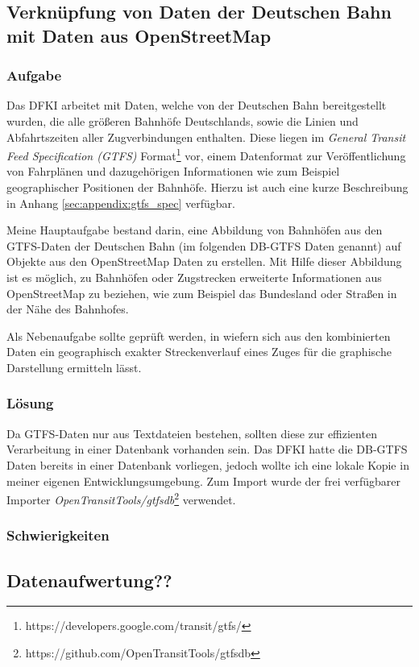 \subsection{Verknüpfung von Daten der Deutschen Bahn mit Daten aus OpenStreetMap}
\subsubsection{Aufgabe}
Das DFKI arbeitet mit Daten, welche von der Deutschen Bahn bereitgestellt wurden, die alle größeren Bahnhöfe Deutschlands, sowie die Linien und Abfahrtszeiten aller Zugverbindungen enthalten.
Diese liegen im \textit{General Transit Feed Specification (GTFS)} Format\footnote{https://developers.google.com/transit/gtfs/} vor, einem Datenformat zur Veröffentlichung von Fahrplänen und dazugehörigen Informationen wie zum Beispiel geographischer Positionen der Bahnhöfe. Hierzu ist auch eine kurze Beschreibung in Anhang \ref{sec:appendix:gtfs_spec} verfügbar.

Meine Hauptaufgabe bestand darin, eine Abbildung von Bahnhöfen aus den GTFS-Daten der Deutschen Bahn (im folgenden DB-GTFS Daten genannt) auf Objekte aus den OpenStreetMap Daten zu erstellen.
Mit Hilfe dieser Abbildung ist es möglich, zu Bahnhöfen oder Zugstrecken erweiterte Informationen aus OpenStreetMap zu beziehen, wie zum Beispiel das Bundesland oder Straßen in der Nähe des Bahnhofes.

Als Nebenaufgabe sollte geprüft werden, in wiefern sich aus den kombinierten Daten ein geographisch exakter Streckenverlauf eines Zuges für die graphische Darstellung ermitteln lässt.
\subsubsection{Lösung}
Da GTFS-Daten nur aus Textdateien bestehen, sollten diese zur effizienten Verarbeitung in einer Datenbank vorhanden sein.
Das DFKI hatte die DB-GTFS Daten bereits in einer Datenbank vorliegen, jedoch wollte ich eine lokale Kopie in meiner eigenen Entwicklungsumgebung.
Zum Import wurde der frei verfügbarer Importer \textit{OpenTransitTools/gtfsdb}\footnote{https://github.com/OpenTransitTools/gtfsdb} verwendet.

\subsubsection{Schwierigkeiten}
\subsection{Datenaufwertung??}
